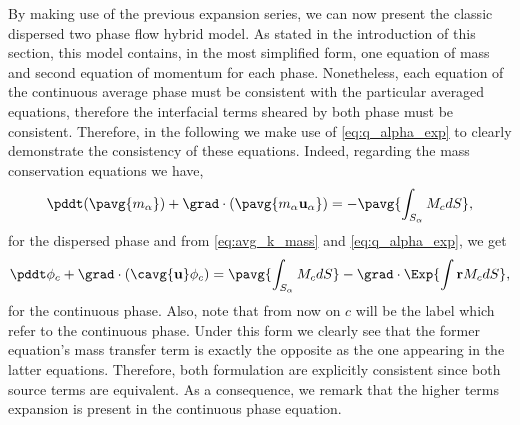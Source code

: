 By making use of the previous expansion series, we can now present the classic dispersed two phase flow hybrid model. 
As stated in the introduction of this section, this model contains, in the most simplified form, one equation of mass and second equation of momentum for each phase. 
Nonetheless, each equation of the continuous average phase must be consistent with the particular averaged equations, therefore the interfacial terms sheared by both phase must be consistent. 
Therefore, in the following we make use of \ref{eq:q_alpha_exp} to clearly demonstrate the consistency of these equations. 
Indeed, regarding the mass conservation equations we have,
\begin{equation}
    \pddt (\pavg{m_\alpha})
    + \grad \cdot \left(\pavg{m_\alpha\textbf{u}_\alpha}\right) 
    = 
    - \pavg{\int_{S_\alpha} M_c dS},
    \label{eq:classic_hybrid_mass_p}
\end{equation}
for the dispersed phase and from \ref{eq:avg_k_mass} and \ref{eq:q_alpha_exp}, we get
\begin{equation}
    \pddt \phi_c 
    + \grad \cdot \left(
        \cavg{\textbf{u}}\phi_c 
    \right) 
    =  \pavg{\int_{S_\alpha} M_c dS} - \grad \cdot \Exp{\int \textbf{r} M_c dS},
    \label{eq:classic_hybrid_mass_c}
\end{equation}
for the continuous phase. 
Also, note that from now on $c$ will be the label which refer to the continuous phase.
Under this form we clearly see that the former equation's mass transfer term is exactly the opposite as the one appearing in the latter equations. 
Therefore, both formulation are explicitly consistent since both source terms are equivalent. 
As a consequence, we remark that the higher terms expansion is present in the continuous phase equation. 

